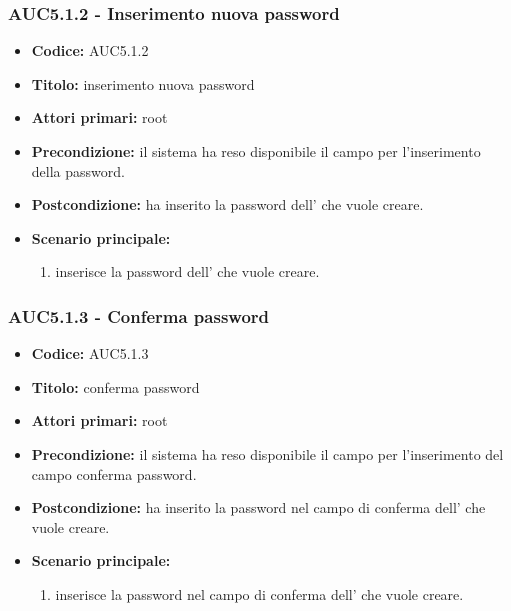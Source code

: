 \documentclass[casi-duso]{subfiles}
\begin{document}
\subsubsection{AUC5.1.2 - Inserimento nuova password}%
\label{subsub:AUC5.1.2}
\begin{itemize}
  \item \textbf{Codice:} AUC5.1.2
  \item \textbf{Titolo:} inserimento nuova password
  \item \textbf{Attori primari:} root
  \item \textbf{Precondizione:} il sistema ha reso disponibile il campo per l'inserimento della password.
  \item \textbf{Postcondizione:}  ha inserito la password dell' che vuole creare.
  \item \textbf{Scenario principale:}
  \begin{enumerate}
    \item {} inserisce la password dell' che vuole creare.
  \end{enumerate}
\end{itemize}
\subsubsection{AUC5.1.3 - Conferma password}%
\label{subsub:AUC5.1.3}
\begin{itemize}
  \item \textbf{Codice:} AUC5.1.3
  \item \textbf{Titolo:} conferma password
  \item \textbf{Attori primari:} root
  \item \textbf{Precondizione:} il sistema ha reso disponibile il campo per l'inserimento del campo conferma password.
  \item \textbf{Postcondizione:}  ha inserito la password nel campo di conferma dell' che vuole creare.
  \item \textbf{Scenario principale:}
  \begin{enumerate}
    \item {} inserisce la password nel campo di conferma dell' che vuole creare.
  \end{enumerate}
\end{itemize}
\end{document}

